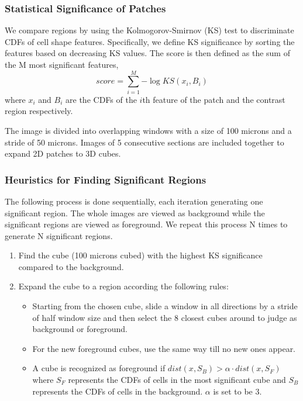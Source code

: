 \documentclass[runningheads]{llncs}
\begin{document}
\subsubsection{Statistical Significance of Patches}

We compare regions by using the Kolmogorov-Smirnov (KS) test to discriminate CDFs of cell shape features. Specifically, we define KS significance by sorting the features based on decreasing KS values. The score is then defined as the sum of the M most significant features,
\begin{equation}
score=\sum_{i=1}^{M}{-\log{KS(x_i, B_i)}}
\end{equation}
where $x_i$ and $B_i$ are the CDFs of the $i$th feature of the patch and the contrast region respectively.

The image is divided into overlapping windows with a size of 100 microns and a stride of 50 microns. Images of 5 consecutive sections are included together to expand 2D patches to 3D cubes. 


\subsubsection{Heuristics for Finding Significant Regions}

The following process is done sequentially, each iteration generating one significant region. The whole images are viewed as background while the significant regions are viewed as foreground. We repeat this process N times to generate N significant regions.
\begin{enumerate}
  \item Find the cube (100 microns cubed) with the highest KS significance compared to the background.
  \item Expand the cube to a region according the following rules:
  		\begin{itemize}
 			 \item Starting from the chosen cube, slide a window in all directions by a stride of half window size and then select the 8 closest cubes around to judge as background or foreground.
  			 \item For the new foreground cubes, use the same way till no new ones appear.
 			 \item A cube is recognized as foreground if $dist(x,S_B )>\alpha \cdot dist(x,S_F)$ where $S_F$ represents the CDFs of cells in the most significant cube and $S_B$ represents the CDFs of cells in the background. $\alpha$ is set to be 3.
		\end{itemize}
\end{enumerate}
\end{document}
